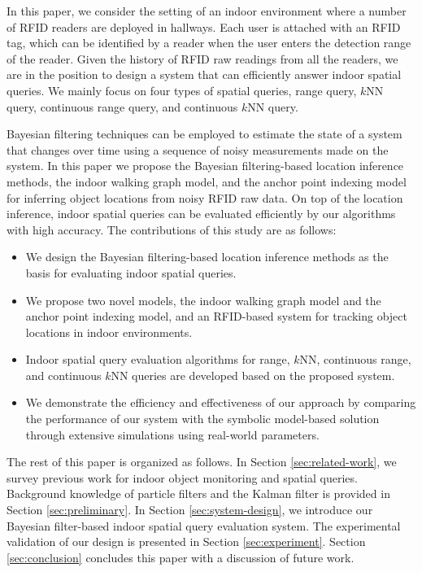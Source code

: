 \documentclass[12pt]{report}
\begin{document}
In this paper, we consider the setting of an indoor environment
where a number of RFID readers are deployed in hallways.  Each user
is attached with an RFID tag, which can be identified by a reader
when the user enters the detection range of the reader.  Given the
history of RFID raw readings from all the readers, we are in the
position to design a system that can efficiently answer indoor
spatial queries.  We mainly focus on four types of spatial queries,
range query, \(k\)NN query, continuous range query, and continuous
\(k\)NN query.

Bayesian filtering techniques
\cite{arulampalam2002-tutorial,maybeck1979-stochastic} can be employed
to estimate the state of a system that changes over time using a
sequence of noisy measurements made on the system.  In this paper we
propose the Bayesian filtering-based location inference methods, the
indoor walking graph model, and the anchor point indexing model for
inferring object locations from noisy RFID raw data.  On top of the
location inference, indoor spatial queries can be evaluated
efficiently by our algorithms with high accuracy.  The contributions
of this study are as follows:

\begin{itemize}
\item We design the Bayesian filtering-based location inference methods
as the basis for evaluating indoor spatial queries.
\item We propose two novel models, the indoor walking graph model and
the anchor point indexing model, and an RFID-based system for
tracking object locations in indoor environments.
\item Indoor spatial query evaluation algorithms for range, \(k\)NN,
continuous range, and continuous \(k\)NN queries are developed
based on the proposed system.
\item We demonstrate the efficiency and effectiveness of our approach by
comparing the performance of our system with the symbolic
model-based solution \cite{yang2010-probabilistic} through extensive
simulations using real-world parameters.
\end{itemize}

The rest of this paper is organized as follows.  In Section
\ref{sec:related-work}, we survey previous work for indoor object
monitoring and spatial queries.  Background knowledge of particle
filters and the Kalman filter is provided in Section
\ref{sec:preliminary}.  In Section \ref{sec:system-design}, we introduce our
Bayesian filter-based indoor spatial query evaluation system.  The
experimental validation of our design is presented in Section
\ref{sec:experiment}.  Section \ref{sec:conclusion} concludes this paper with
a discussion of future work.
\end{document}
